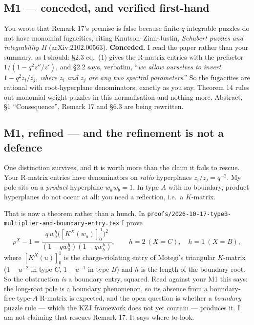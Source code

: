 \documentclass[11pt]{article}
\theoremstyle{definition}
\begin{document}
\subsection{M1 --- conceded, and verified first-hand}
You wrote that Remark 17's premise is false because finite-$q$ integrable puzzles do not have
monomial fugacities, citing Knutson--Zinn-Justin, \emph{Schubert puzzles and integrability II}
(arXiv:2102.00563).  \textbf{Conceded.}  I read the paper rather than your summary, as I should:
\S2.3 eq.~(1) gives the R-matrix entries with the prefactor $1/(1-q^2z''/z')$, and \S2.2 says,
verbatim, ``\emph{we allow ourselves to invert $1-q^2z_i/z_j$, where $z_i$ and $z_j$ are any two
spectral parameters}.''  So the fugacities are rational with root-hyperplane denominators,
exactly as you say.  Theorem 14 rules out monomial-weight puzzles in this normalisation and
nothing more.  Abstract, \S1 ``Consequence'', Remark 17 and \S6.3 are being rewritten.

\subsection{M1, refined --- and the refinement is not a defence}
One distinction survives, and it is worth more than the claim it fails to rescue.  Your R-matrix
entries have denominators on \emph{ratio} hyperplanes $z_i/z_j=q^{-2}$.  My pole sits on a
\emph{product} hyperplane $w_aw_b=1$.  In type $A$ with no boundary, product hyperplanes do not
occur at all: you need a reflection, i.e.\ a $K$-matrix.

That is now a theorem rather than a hunch.  In
\texttt{proofs/2026-10-17-typeB-multiplier-and-boundary-entry.tex} I prove
\begin{equation}\label{eq:dict}
  \rho^X-1=\frac{q\,w_a^{h}\bigl([K^X(w_a)]_0^{\,1}\bigr)^2}
                {(1-qw_a^{h})(1-qw_b^{h})},
  \qquad h=2\ (X=C),\quad h=1\ (X=B),
\end{equation}
where $[K^X(u)]_0^{1}$ is the charge-violating entry of Motegi's triangular $K$-matrix
($1-u^{-2}$ in type $C$, $1-u^{-1}$ in type $B$) and $h$ is the length of the boundary root.
So the obstruction \emph{is} a boundary entry, squared.  Read against your M1 this says: the
long-root pole is a boundary phenomenon, so its absence from a boundary-free type-$A$ R-matrix
is expected, and the open question is whether a \emph{boundary} puzzle rule --- which the KZJ
framework does not yet contain --- produces it.  I am not claiming that rescues Remark 17.  It
says where to look.
\end{document}
